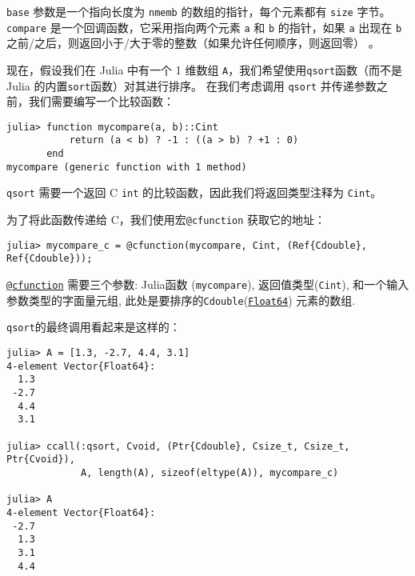 \texttt{base} 参数是一个指向长度为 \texttt{nmemb} 的数组的指针，每个元素都有 \texttt{size} 字节。 \texttt{compare} 是一个回调函数，它采用指向两个元素 \texttt{a} 和 \texttt{b} 的指针，如果 \texttt{a} 出现在 \texttt{b} 之前/之后，则返回小于/大于零的整数（如果允许任何顺序，则返回零） 。



现在，假设我们在 Julia 中有一个 1 维数组 \texttt{A}，我们希望使用\texttt{qsort}函数（而不是 Julia 的内置\texttt{sort}函数）对其进行排序。 在我们考虑调用 \texttt{qsort} 并传递参数之前，我们需要编写一个比较函数：




\begin{verbatim}
julia> function mycompare(a, b)::Cint
           return (a < b) ? -1 : ((a > b) ? +1 : 0)
       end
mycompare (generic function with 1 method)
\end{verbatim}



\texttt{qsort} 需要一个返回 C \texttt{int} 的比较函数，因此我们将返回类型注释为 \texttt{Cint}。



为了将此函数传递给 C，我们使用宏\texttt{@cfunction} 获取它的地址：




\begin{verbatim}
julia> mycompare_c = @cfunction(mycompare, Cint, (Ref{Cdouble}, Ref{Cdouble}));
\end{verbatim}



\hyperlink{11617107520401351255}{\texttt{@cfunction}} 需要三个参数: Julia函数 (\texttt{mycompare}), 返回值类型(\texttt{Cint}), 和一个输入参数类型的字面量元组, 此处是要排序的\texttt{Cdouble}(\hyperlink{5027751419500983000}{\texttt{Float64}}) 元素的数组.



\texttt{qsort}的最终调用看起来是这样的：




\begin{verbatim}
julia> A = [1.3, -2.7, 4.4, 3.1]
4-element Vector{Float64}:
  1.3
 -2.7
  4.4
  3.1

julia> ccall(:qsort, Cvoid, (Ptr{Cdouble}, Csize_t, Csize_t, Ptr{Cvoid}),
             A, length(A), sizeof(eltype(A)), mycompare_c)

julia> A
4-element Vector{Float64}:
 -2.7
  1.3
  3.1
  4.4
\end{verbatim}



